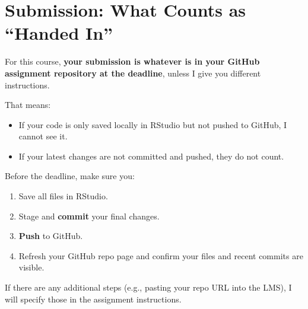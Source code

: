 \documentclass[11pt]{scrartcl}
\begin{document}
\section{Submission: What Counts as ``Handed In''}

For this course, \textbf{your submission is whatever is in your GitHub assignment repository at the deadline}, unless I give you different instructions.

That means:

\begin{itemize}[nosep]
  \item If your code is only saved locally in RStudio but not pushed to GitHub, I cannot see it.
  \item If your latest changes are not committed and pushed, they do not count.
\end{itemize}

Before the deadline, make sure you:

\begin{enumerate}[label=\arabic*., nosep]
  \item Save all files in RStudio.
  \item Stage and \textbf{commit} your final changes.
  \item \textbf{Push} to GitHub.
  \item Refresh your GitHub repo page and confirm your files and recent commits are visible.
\end{enumerate}

If there are any additional steps (e.g., pasting your repo URL into the LMS), I will specify those in the assignment instructions.
\end{document}
